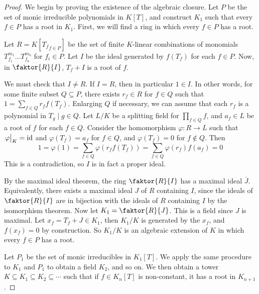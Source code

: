 \begin{proof}
	We begin by proving the existence of the algebraic closure.
	Let \( P \) be the set of monic irreducible polynomials in \( K[T] \), and construct \( K_1 \) such that every \( f \in P \) has a root in \( K_1 \).
	First, we will find a ring in which every \( f \in P \) has a root.

	Let \( R = K[{T_f}_{f \in P}] \) be the set of finite \( K \)-linear combinations of monomials \( T_{f_1}^{m_1} \dots T_{f_k}^{m_k} \) for \( f_i \in P \).
	Let \( I \) be the ideal generated by \( f(T_f) \) for each \( f \in P \).
	Now, in \( \faktor{R}{I} \), \( T_f + I \) is a root of \( f \).

	We must check that \( I \neq R \).
	If \( I = R \), then in particular \( 1 \in I \).
	In other words, for some finite subset \( Q \subseteq P \), there exists \( r_f \in R \) for \( f \in Q \) such that \( 1 = \sum_{f \in Q} r_f f(T_f) \).
	Enlarging \( Q \) if necessary, we can assume that each \( r_f \) is a polynomial in \( {T_g \mid g \in Q} \).
	Let \( L / K \) be a splitting field for \( \prod_{f \in Q} f \), and \( a_f \in L \) be a root of \( f \) for each \( f \in Q \).
	Consider the homomorphism \( \varphi \colon R \to L \) such that \( \eval{\varphi}_K = \mathrm{id} \) and \( \varphi(T_f) = a_f \) for \( f \in Q \), and \( \varphi(T_f) = 0 \) for \( f \not\in Q \).
	Then
	\[ 1 = \varphi(1) = \sum_{f \in Q} \varphi(r_f f(T_f)) = \sum_{f \in Q} \varphi(r_f) f(a_f) = 0 \]
	This is a contradiction, so \( I \) is in fact a proper ideal.

	By the maximal ideal theorem, the ring \( \faktor{R}{I} \) has a maximal ideal \( \overline J \).
	Equivalently, there exists a maximal ideal \( J \) of \( R \) containing \( I \), since the ideals of \( \faktor{R}{I} \) are in bijection with the ideals of \( R \) containing \( I \) by the isomorphism theorem.
	Now let \( K_1 = \faktor{R}{J} \).
	This is a field since \( J \) is maximal.
	Let \( x_f = T_f + J \in K_1 \), then \( K_1 / K \) is generated by the \( x_f \), and \( f(x_f) = 0 \) by construction.
	So \( K_1 / K \) is an algebraic extension of \( K \) in which every \( f \in P \) has a root.

	Let \( P_1 \) be the set of monic irreducibles in \( K_1[T] \).
	We apply the same procedure to \( K_1 \) and \( P_1 \) to obtain a field \( K_2 \), and so on.
	We then obtain a tower \( K \subseteq K_1 \subseteq K_2 \subseteq \cdots \) such that if \( f \in K_n[T] \) is non-constant, it has a root in \( K_{n+1} \).


\end{proof}
